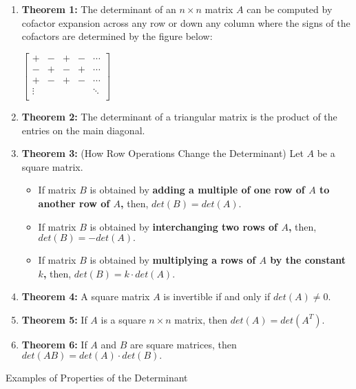 \documentclass[11pt,fleqn]{article}
\begin{document}
\renewcommand{\headrulewidth}{0pt}
\newcommand{\blank}[1]{\rule{#1}{0.75pt}}
\renewcommand{\d}{\displaystyle}

\newcommand{\bpm}{\begin{pmatrix}}
\newcommand{\epm}{\end{pmatrix}}
\newcommand{\bbm}{\begin{bmatrix}}
\newcommand{\ebm}{\end{bmatrix}}

\vspace*{-0.7in}

\begin{center}
  \large {} \end{center}
 \begin{enumerate}
 \item \textbf{Theorem 1:} The determinant of an $n \times n$ matrix $A$ can be computed by cofactor expansion across any row or down any column where the signs of the cofactors are determined by the figure below:
 
 $\bbm +&-&+&-& \cdots \\
 -&+&-&+& \cdots \\
 +&-&+&-& \cdots \\
 \vdots&&&&\ddots\\
 \ebm$
 \vfill
 \item \textbf{Theorem 2:} The determinant of a triangular matrix is the product of the entries on the main diagonal.
 \vfill
 \item \textbf{Theorem 3:} (How Row Operations Change the Determinant) Let $A$ be a square matrix.
 \begin{itemize}
 	\item If matrix $B$ is obtained by \textbf{adding a multiple of one row of $A$ to another row of $A$,} then, $det(B)=det(A).$
	\item If matrix $B$ is obtained by \textbf{interchanging two rows of $A$,} then, $det(B)=-det(A).$
	\item If matrix $B$ is obtained by \textbf{multiplying a rows of $A$ by the constant $k$,} then, $det(B)=k\cdot det(A).$ 
\end{itemize}
 \vfill
 \item \textbf{Theorem 4:}  A square matrix $A$ is invertible if and only if $det(A) \not = 0.$
 \vfill
 \item \textbf{Theorem 5:} If $A$ is a square $n \times n$ matrix, then $det(A)=det(A^T).$
 \vfill
 \item \textbf{Theorem 6:} If $A$ and $B$ are square matrices, then $det(AB)=det(A)\cdot det(B).$
 \vfill
 
  \end{enumerate}
  \newpage
  \begin{center}{Examples of Properties of the Determinant } \end{center}
  
\end{document}
